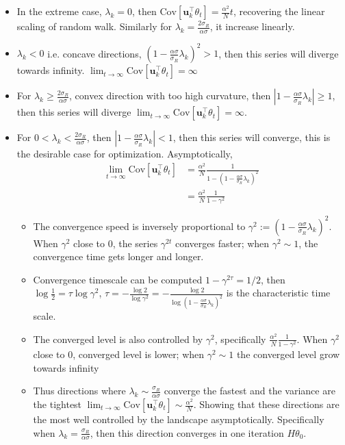     \begin{itemize}
    \item In the extreme case, $\lambda_{k}=0$, then $\mathrm{Cov}[\mathbf{u}_{k}^{\top}\theta_{t}]=\frac{\alpha^{2}}{N}t$,
    recovering the linear scaling of random walk. Similarly for $\lambda_{k}=\frac{2\sigma_{R}}{\alpha\sigma}$,
    it increase linearly. 
    \item $\lambda_{k}<0$ i.e. concave directions, $(1-\frac{\alpha\sigma}{\sigma_{R}}\lambda_{k})^{2}>1$,
    then this series will diverge towards infinity. $\lim_{t\to\infty}\mathrm{Cov}[\mathbf{u}_{k}^{\top}\theta_{t}]=\infty$
    \item For $\lambda_{k}\geq\frac{2\sigma_{R}}{\alpha\sigma}$, convex direction
    with too high curvature, then $|1-\frac{\alpha\sigma}{\sigma_{R}}\lambda_{k}|\geq1$,
    then this series will diverge $\lim_{t\to\infty}\mathrm{Cov}[\mathbf{u}_{k}^{\top}\theta_{t}]=\infty$.
    \item For $0<\lambda_{k}<\frac{2\sigma_{R}}{\alpha\sigma}$, then $|1-\frac{\alpha\sigma}{\sigma_{R}}\lambda_{k}|<1$,
    then this series will converge, this is the desirable case for optimization.
    Asymptotically, 
    \begin{align*}
    \lim_{t\to\infty}\mathrm{Cov}[\mathbf{u}_{k}^{\top}\theta_{t}] & =\frac{\alpha^{2}}{N}\frac{1}{1-(1-\frac{\alpha\sigma}{\sigma_{R}}\lambda_{k})^{2}}\\
     & =\frac{\alpha^{2}}{N}\frac{1}{1-\gamma^{2}}
    \end{align*}
    
    \begin{itemize}
    \item The convergence speed is inversely proportional to $\gamma^{2}:=(1-\frac{\alpha\sigma}{\sigma_{R}}\lambda_{k})^{2}$.
    When $\gamma^{2}$ close to $0$, the series $\gamma^{2t}$ converges
    faster; when $\gamma^{2}\sim1$, the convergence time gets longer
    and longer. 
    \item Convergence timescale can be computed $1-\gamma^{2\tau}=1/2$, then
    $\log\frac{1}{2}=\tau\log\gamma^{2}$, $\tau=-\frac{\log2}{\log\gamma^{2}}=-\frac{\log2}{\log(1-\frac{\alpha\sigma}{\sigma_{R}}\lambda_{k})^{2}}$
    is the characteristic time scale. 
    \item The converged level is also controlled by $\gamma^{2}$, specifically
    $\frac{\alpha^{2}}{N}\frac{1}{1-\gamma^{2}}$. When $\gamma^{2}$
    close to $0$, converged level is lower; when $\gamma^{2}\sim1$ the
    converged level grow towards infinity
    \item Thus directions where $\lambda_{k}\sim\frac{\sigma_{R}}{\alpha\sigma}$
    converge the fastest and the variance are the tightest $\lim_{t\to\infty}\mathrm{Cov}[\mathbf{u}_{k}^{\top}\theta_{t}]\sim\frac{\alpha^{2}}{N}$.
    Showing that these directions are the most well controlled by the
    landscape asymptotically. Specifically when $\lambda_{k}=\frac{\sigma_{R}}{\alpha\sigma}$,
    then this direction converges in one iteration $H\theta_{0}$. 
    \end{itemize}
    \end{itemize}
    